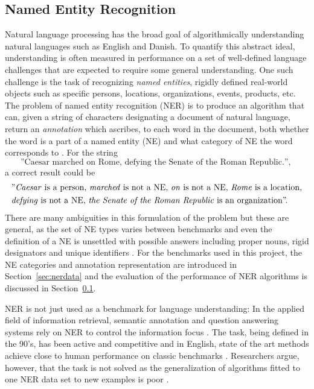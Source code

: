 \documentclass[main.tex]{subfiles}
\begin{document}
\subsection{Named Entity Recognition}
Natural language processing has the broad goal of algorithmically understanding natural languages such as English and Danish.
To quantify this abstract ideal, understanding is often measured in performance on a set of well-defined language challenges that are expected to require some general understanding.
One such challenge is the task of recognizing \emph{named entities}, rigidly defined real-world objects such as specific persons, locations, organizations, events, products, etc.
The problem of named entity recognition (NER) is to produce an algorithm that can, given a string of characters designating a document of natural language, return an \emph{annotation} which ascribes, to each word in the document, both whether the word is a part of a named entity (NE) and what category of NE the word corresponds to \cite{wiki2021ner}.
For the string
\[
    \text{
        ''Caesar marched on Rome, defying the Senate of the Roman Republic.'',
    }
\]
a correct result could be
\begin{align*}
    & \text{
        ''\emph{Caesar} is a person,
        \emph{marched} is not a NE,
        \emph{on} is not a NE,
        \emph{Rome} is a location,
    }\\
    &\text{
        \emph{defying} is not a NE,
        \emph{the Senate of the Roman Republic} is an organization''.
    }
\end{align*}
There are many ambiguities in this formulation of the problem but these are general, as the set of NE types varies between benchmarks and even the definition of a NE is unsettled with possible answers including proper nouns, rigid designators and unique identifiers \cite[Sec. 4]{marrero2013ner}.
For the benchmarks used in this project, the NE categories and annotation representation are introduced in Section~\ref{sec:nerdata} and the evaluation of the performance of NER algorithms is discussed in Section~\ref{}.

NER is not just used as a benchmark for language understanding:
In the applied field of information retrieval, semantic annotation and question answering systems rely on NER to control the information focus \cite[Sec. 2]{marrero2013ner}.
The task, being defined in the 90's, has been active and competitive and in English, state of the art methods achieve close to human performance on classic benchmarks \cite{wiki2021ner, marrero2013ner}.
Researchers argue, however, that the task is not solved as the generalization of algorithms fitted to one NER data set to new examples is poor \cite[Sec. 7.2]{marrero2013ner}.
\end{document}
